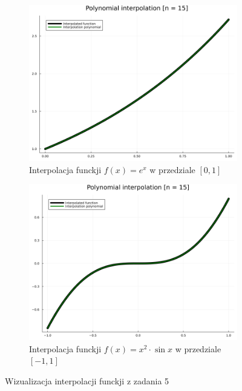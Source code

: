 \documentclass[11pt]{article}
\begin{document}
\begin{figure}[htbp]
\begin{subfigure}[b]{0.45\textwidth}
                \includegraphics[width=\linewidth]{img/ex5_f1_n15.png}
                \caption{Interpolacja funckji $f(x) = e^x$ w przedziale $[0, 1]$}
            \end{subfigure}
            \hfill
            \begin{subfigure}[b]{0.45\textwidth}
                \includegraphics[width=\linewidth]{img/ex5_f2_n15.png}
                \caption{Interpolacja funckji $f(x) = x^2 \cdot \sin{x}$ w przedziale $[-1, 1]$}
            \end{subfigure}
            \caption{Wizualizacja interpolacji funckji z zadania 5}
        \end{figure}

    \newpage
\end{document}
